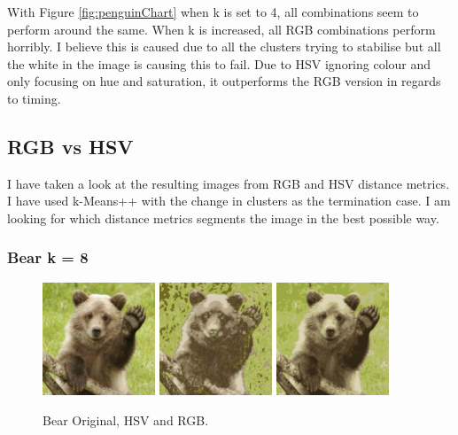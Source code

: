 \documentclass{article}
\begin{document}
With Figure \ref{fig:penguinChart} when k is set to 4, all combinations seem to
perform around the same. When k is increased, all RGB combinations perform
horribly. I believe this is caused due to all the clusters trying to stabilise
but all the white in the image is causing this to fail. Due to HSV ignoring
colour and only focusing on hue and saturation, it outperforms the RGB version
in regards to timing.

\subsection{RGB vs HSV}
I have taken a look at the resulting images from RGB and HSV distance metrics. I
have used k-Means++ with the change in clusters as the termination case. I am
looking for which distance metrics segments the image in the best possible way.

\subsubsection{Bear k = 8}

\begin{figure}[ht]
\begin{center}
\includegraphics[width=0.3\textwidth]{images/bear}
\includegraphics[width=0.3\textwidth]{images/hsv_8_bear}
\includegraphics[width=0.3\textwidth]{images/rgb_8_bear}
\caption{Bear Original, HSV and RGB.}
\label{fig:bear}
\end{center}
\end{figure}
\end{document}
